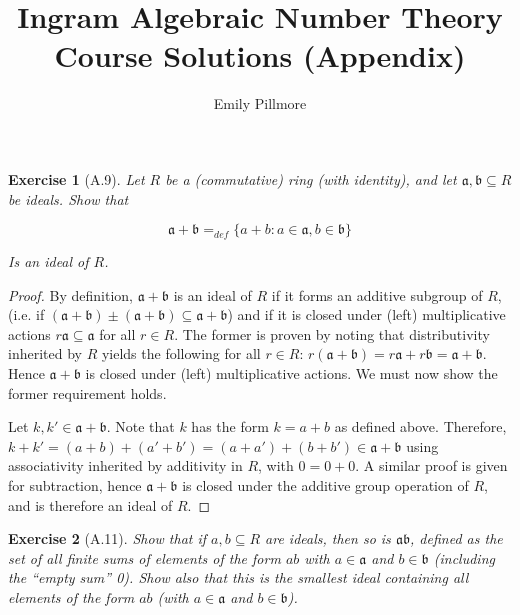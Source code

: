 \documentclass[10pt]{article}
\title{Ingram Algebraic Number Theory Course Solutions (Appendix)}
\author{Emily Pillmore}
\newtheorem{exercise}{Exercise}
\newcommand{\ia}{\mathfrak{a}}
\newcommand{\ib}{\mathfrak{b}}
\newcommand{\seq}{\subseteq}
\begin{document}
\maketitle

\begin{exercise}[A.9]
Let $R$ be a (commutative) ring (with identity), and let $\ia, \ib \seq R$ be ideals. Show that
	\begin{center}
		\begin{equation*}
			\ia + \ib =_{def}  \{ a + b :  a \in \ia, b \in \ib\} 
		\end{equation*}
	\end{center}
Is an ideal of $R$.
\end{exercise}
\begin{proof}
By definition, $\ia + \ib$ is an ideal of $R$ if it forms an additive subgroup of $R$, (i.e. if $(\ia + \ib) \pm (\ia + \ib) \seq \ia + \ib$) and if it is closed under (left) multiplicative actions $r\ia \seq \ia$ for all $r \in R$. The former is proven by noting that distributivity inherited by $R$ yields the following for all $r \in R$: $r(\ia + \ib) = r\ia + r\ib = \ia + \ib$. Hence $\ia + \ib$ is closed under (left) multiplicative actions. We must now show the former requirement holds. 

Let $k, k' \in \ia + \ib$. Note that $k$ has the form $k = a + b$ as defined above. Therefore, $k + k' = (a + b) + (a' + b') = (a + a') + (b + b') \in \ia + \ib$ using associativity inherited by additivity in $R$, with $0 = 0 + 0$. A similar proof is given for subtraction, hence $\ia + \ib$ is closed under the additive group operation of $R$, and is therefore an ideal of $R$.
\end{proof}

\begin{exercise}[A.11]
Show that if $a, b \seq R$ are ideals, then so is $\ia\ib$, defined as the set of all finite sums of elements of the form $ab$ with $a \in \ia$ and $b \in \ib$ (including the “empty sum” 0). Show also that this is the smallest ideal containing all elements of the form $ab$ (with $a \in \ia$ and $b \in \ib$).
\end{exercise}
\end{document}
